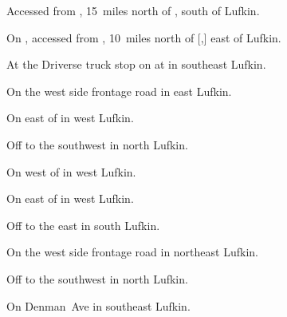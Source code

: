 
\begin{LocationList}

Accessed from , 15~miles north of , south of Lufkin.

On , accessed from , 10~miles north of [,] east of Lufkin.

At the Driverse truck stop on  at  in southeast Lufkin.

\Location{\GarageHQ \Garage}
On the west side   frontage road in east Lufkin.

On  east of  in west Lufkin.

Off   to the southwest in north Lufkin.

On  west of  in west Lufkin.

On  east of  in west Lufkin.

Off  to the east in south Lufkin.

\Location{\TruckService \Service}
On the west side   frontage road in northeast Lufkin.

Off   to the southwest in north Lufkin.

On  Denman~Ave in southeast Lufkin.

\end{LocationList}
